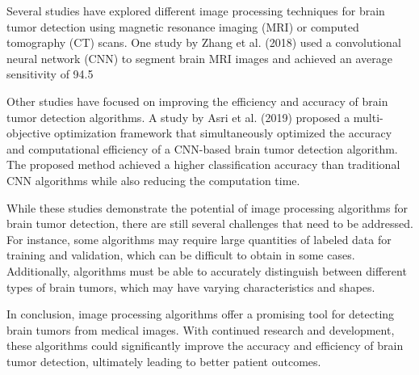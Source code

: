 \documentclass{article}
\begin{document}
Several studies have explored different image processing techniques for brain tumor detection using magnetic resonance imaging (MRI) or computed tomography (CT) scans. One study by Zhang et al. (2018) used a convolutional neural network (CNN) to segment brain MRI images and achieved an average sensitivity of 94.5 %

Other studies have focused on improving the efficiency and accuracy of brain tumor detection algorithms. A study by Asri et al. (2019) proposed a multi-objective optimization framework that simultaneously optimized the accuracy and computational efficiency of a CNN-based brain tumor detection algorithm. The proposed method achieved a higher classification accuracy than traditional CNN algorithms while also reducing the computation time.

While these studies demonstrate the potential of image processing algorithms for brain tumor detection, there are still several challenges that need to be addressed. For instance, some algorithms may require large quantities of labeled data for training and validation, which can be difficult to obtain in some cases. Additionally, algorithms must be able to accurately distinguish between different types of brain tumors, which may have varying characteristics and shapes.

In conclusion, image processing algorithms offer a promising tool for detecting brain tumors from medical images. With continued research and development, these algorithms could significantly improve the accuracy and efficiency of brain tumor detection, ultimately leading to better patient outcomes.
\end{document}
